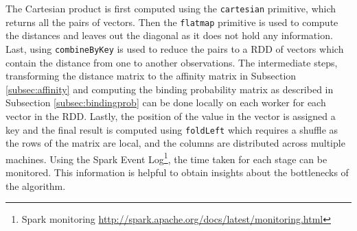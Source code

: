 The Cartesian product is first computed using the \texttt{cartesian} primitive, which returns all the pairs of vectors. Then the \texttt{flatmap} primitive is used to compute the distances and leaves out the diagonal as it does not hold any information. Last, using \texttt{combineByKey} is used to reduce the pairs to a RDD of vectors which contain the distance from one to another observations. The intermediate steps, transforming the distance matrix to the affinity matrix in Subsection \ref{subsec:affinity} and computing the binding probability matrix as described in Subsection \ref{subsec:bindingprob} can be done locally on each worker for each vector in the RDD. Lastly, the position of the value in the vector is assigned a key and the final result is computed using \texttt{foldLeft} which requires a shuffle as the rows of the matrix are local, and the columns are distributed across multiple machines. Using the Spark Event Log\footnote{Spark monitoring \url{http://spark.apache.org/docs/latest/monitoring.html}}, the time taken for each stage can be monitored. This information is helpful to obtain insights about the bottlenecks of the algorithm.

